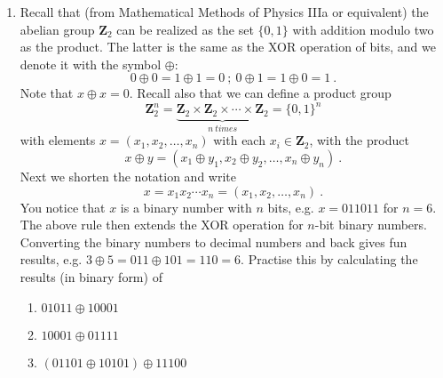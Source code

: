 \documentclass[12pt]{article}
\newcommand{\be}{\begin{equation}}
\newcommand{\ee}{\end{equation}}
\newcommand{\Zmath}{\mathbf{Z}}
\begin{document}
\begin{enumerate}
\item Recall that (from Mathematical Methods of Physics IIIa or equivalent) the abelian group $\Zmath_2$ can be realized as the set $\{0,1\}$ with addition modulo two as the product.
The latter is the same as the XOR operation of bits, and we denote it with the symbol $\oplus$:
\be
0\oplus 0 = 1\oplus 1 = 0 \ ; \ 0\oplus 1 = 1\oplus 0 = 1 \ .
\ee
Note that $x\oplus x=0$. Recall also that we can define a product group 
\be
\Zmath^n_2 = \underbrace{\Zmath_2 \times \Zmath_2 \times \cdots \times \Zmath_2}_{n\ times} = \{0,1\}^n
\ee
with elements $x = (x_1,x_2,\ldots ,x_n)$ with each $x_i\in \Zmath_2$, with the product
\be
x\oplus y = (x_1\oplus y_1, x_2\oplus y_2,\ldots , x_n\oplus y_n) \ .
\ee
Next we shorten the notation and write
\be
x = x_1x_2\cdots x_n = (x_1,x_2,\ldots ,x_n) \ .
\ee
You notice that $x$ is a binary number with $n$ bits, e.g. $x= 011011$ for $n=6$. The above rule then extends the XOR operation for $n$-bit binary numbers. Converting
the binary numbers to decimal numbers and back gives fun results, e.g. $3\oplus 5 = 011\oplus 101 = 110 = 6$. Practise this by
calculating the results (in binary form) of
\begin{enumerate}
\item $01011\oplus 10001$
\item $10001  \oplus 01111$
\item $(01101\oplus 10101)\oplus 11100$
\end{enumerate}  


\end{enumerate}
\end{document}
